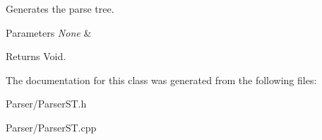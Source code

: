 Generates the parse tree. 


\begin{DoxyParams}{Parameters}
{\em None} & \\
\hline
\end{DoxyParams}
\begin{DoxyReturn}{Returns}
Void. 
\end{DoxyReturn}


The documentation for this class was generated from the following files\+:\begin{DoxyCompactItemize}
\item 
Parser/Parser\+S\+T.\+h\item 
Parser/Parser\+S\+T.\+cpp\end{DoxyCompactItemize}
